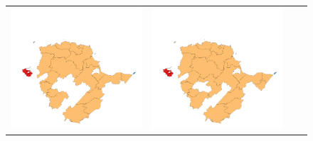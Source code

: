 \begin{figure}
\begin{tabularx}{1\textwidth}{XXXX}
\includegraphics[width=1\linewidth]{images/ch6/contig/15}&
\includegraphics[width=1\linewidth]{images/ch6/contig/16} \\

\end{tabularx}
\end{figure}
